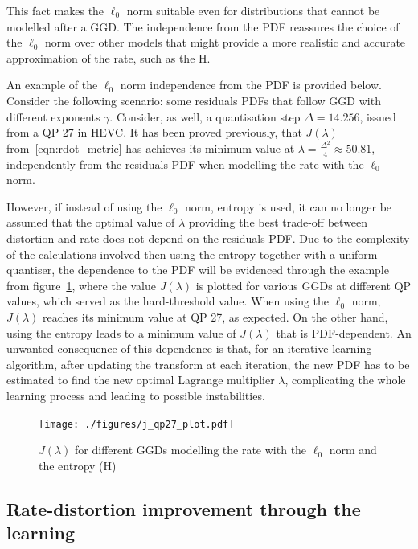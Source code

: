 \documentclass[11pt,a4paper,openright,twoside]{book}
\numberwithin{equation}{section} %
\numberwithin{figure}{section} %
\numberwithin{table}{section} %
\begin{document}
This fact makes the $\ell_0$ norm suitable even for distributions
that cannot be modelled after a \ac{GGD}.
The independence from the \ac{PDF} reassures the choice of the $\ell_0$
norm over other models that might provide a more realistic and accurate
approximation of the rate, such as the \ac{H}.

An example of the $\ell_0$ norm independence from the \ac{PDF} is provided
below.
Consider the following scenario: some residuals \acp{PDF} that follow
\ac{GGD} with different exponents $\gamma$.
Consider, as well, a quantisation step $\Delta=14.256$, issued from a
\ac{QP} 27 in \ac{HEVC}.
It has been proved previously, that $J(\lambda)$
from~\eqref{eqn:rdot_metric} has achieves its minimum value at
$\lambda=\frac{\Delta^2}{4}\approx50.81$, independently from the
residuals \ac{PDF} when modelling the rate with the $\ell_0$ norm.

However, if instead of using the $\ell_0$ norm, entropy is used, it can
no longer be assumed that the optimal value of $\lambda$ providing the
best trade-off between distortion and rate does not depend on the
residuals \ac{PDF}.
Due to the complexity of the calculations involved then using the
entropy together with a uniform quantiser, the dependence to the
\ac{PDF} will be evidenced through the example from
figure~\ref{fig:j_lambda_qp}, where the value $J(\lambda)$ is plotted
for various \acp{GGD} at different \ac{QP} values, which served as the
hard-threshold value.
When using the $\ell_0$ norm, $J(\lambda)$ reaches its minimum value at
QP 27, as expected.
On the other hand, using the entropy leads to a minimum value of
$J(\lambda)$ that is \ac{PDF}-dependent.
An unwanted consequence of this dependence is that, for an iterative
learning algorithm, after updating the transform at each iteration, the
new \ac{PDF} has to be estimated to find the new optimal Lagrange
multiplier $\lambda$, complicating the whole learning process and
leading to possible instabilities.
\begin{figure}[tp]
	\centering
	\texttt{[image: ./figures/j\_qp27\_plot.pdf]}
	\caption{$J(\lambda)$ for different \acp{GGD} modelling the rate with
	the $\ell_0$ norm and the entropy (H)}
	\label{fig:j_lambda_qp}
\end{figure}

\subsection{Rate-distortion improvement through the learning}
\label{sub:rate_distortion_improvement_through_the_learning}
\end{document}
